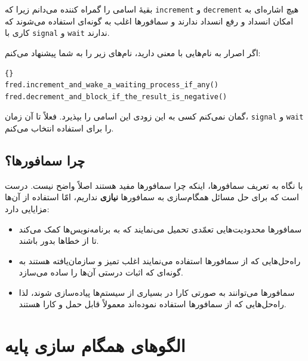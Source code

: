 \documentclass{book}
\newcommand{\clearemptydoublepage}{}%
\begin{document}
    بقیه‌ٔ اسامی را گمراه کننده می‌دانم زیرا که  \texttt{increment} و \texttt{decrement}
    هیچ اشاره‌ای به امکان انسداد و رفع انسداد ندارند و سمافورها اغلب به گونه‌ای استفاده می‌شوند که کاری با \texttt{signal} و \texttt{wait}
    ندارند. 
    
    اگر اصرار به نام‌هایی با معنی دارید، نام‌های زیر را به شما پیشنهاد می‌کنم:
    

\begin{latin}
\begin{lstlisting}[title=\rl{اعمال سمافور}]{}
fred.increment_and_wake_a_waiting_process_if_any()
fred.decrement_and_block_if_the_result_is_negative()	
\end{lstlisting}
\end{latin}

    گمان نمی‌کنم کسی به این زود‌ی این اسامی را بپذیرد. فعلاً تا آن زمان، \texttt{signal} و \texttt{wait}
     را برای استفاده انتخاب می‌کنم.
    

\section{چرا سمافورها؟}

    با نگاه به تعریف سمافورها، اینکه چرا سمافورها مفید هستند اصلاً واضح نیست. 
    درست است که برای حل مسائل همگام‌سازی به سمافورها \textbf{نیازی} نداریم، امّا استفاده از آن‌ها مزایایی دارد:

\begin{itemize}

\item 
    سمافورها محدودیت‌هایی تعمّدی تحمیل می‌نمایند که به برنامه‌نویس‌ها کمک می‌کند تا از خطاها بدور باشند. 

\item 
    راه‌حل‌هایی که از سمافورها استفاده می‌نمایند اغلب تمیز و سازمان‌یافته هستند به گونه‌ای که اثبات درستی آن‌ها را ساده می‌سازد. 

\item 
    سمافورها می‌توانند به صورتی کارا در بسیاری از سیستم‌ها پیاده‌سازی شوند، لذا راه‌حل‌هایی که از سمافورها استفاده نموده‌اند معمولاً قابل حمل 
    و کارا هستند. 
\end{itemize}

\clearemptydoublepage

\chapter{الگوهای همگام سازی پایه}
\end{document}
